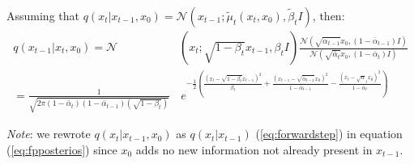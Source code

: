 \documentclass{article}
\numberwithin{equation}{section}
\numberwithin{figure}{section}
\begin{document}
Assuming that $q\left(x_t | x_{t-1}, x_0\right) = \mathcal{N}\left(x_{t-1}; \tilde{\mu}_t \left(x_t, x_0\right), \tilde{\beta}_t I\right)$, then:
\begin{align}
  q\left(x_{t-1} | x_t, x_0\right) = \mathcal{N} & \left(x_t; \sqrt{1 - \beta_t}x_{t-1}, \beta_t I\right) \frac{\mathcal{N}\left(\sqrt{\bar{\alpha}_{t-1}} x_0, \left(1 - \bar{\alpha}_{t-1}\right)I\right)}{\mathcal{N}\left(\sqrt{\bar{\alpha}_t} x_0, \left(1 - \bar{\alpha}_t\right)I\right)} \label{eq:fpposterios} \\[15pt]
  = \frac{1}{\sqrt{2 \pi \left(1 - \bar{\alpha}_t\right) \left(1 - \bar{\alpha}_{t-1}\right) \left(\sqrt{1 - \beta_t}\right)}} & \, e^{- \frac{1}{2} \left(\frac{\left(x_t - \sqrt{1 - \beta_t}x_{t-1}\right)^2}{\beta_t} + \frac{\left(x_{t-1} - \sqrt{\bar{\alpha}_{t-1}}x_0\right)^2}{1 - \bar{\alpha}_{t-1}} - \frac{\left(x_t - \sqrt{\alpha}_t x_0\right)^2}{1 - \bar{\alpha}_{t}}\right)} \label{eq:bayeseq}
\end{align}

\textit{Note}: we rewrote $q\left(x_t | x_{t-1}, x_0\right)$ as $q\left(x_t | x_{t-1}\right)$ (\ref{eq:forwardstep}) in equation (\ref{eq:fpposterios}) since $x_0$ adds no new information not already present in $x_{t-1}$.
\end{document}
